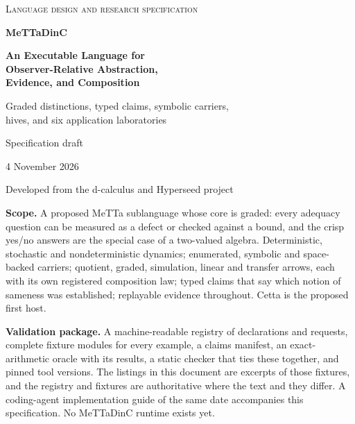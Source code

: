 \documentclass[11pt]{article}
\theoremstyle{definition}
\theoremstyle{plain}
\begin{document}
\hypersetup{pageanchor=false}
\begin{titlepage}
\thispagestyle{empty}
\vspace*{2.2cm}
{\color{dcblue}\large\scshape Language design and research specification\par}
\vspace{1.4cm}
{\color{dcblue}\fontsize{30}{36}\selectfont\bfseries MeTTaDinC\par}
\vspace{0.6cm}
{\LARGE\bfseries An Executable Language for\\[2pt] Observer-Relative Abstraction,\\[2pt] Evidence, and Composition\par}
\vspace{0.7cm}
{\large Graded distinctions, typed claims, symbolic carriers,\\ hives, and six application laboratories\par}
\vspace{1.6cm}
{\large Specification draft\par}
{4 November 2026\par}
\vspace{0.8cm}
{Developed from the d-calculus and Hyperseed project\par}
\vfill
\noindent\begin{minipage}{\textwidth}
\small
{\color{dcblue}\bfseries Scope.} A proposed MeTTa sublanguage whose core is graded: every
adequacy question can be measured as a defect or checked against a bound, and the crisp yes/no
answers are the special case of a two-valued algebra. Deterministic, stochastic and
nondeterministic dynamics; enumerated, symbolic and space-backed carriers; quotient, graded,
simulation, linear and transfer arrows, each with its own registered composition law; typed
claims that say which notion of sameness was established; replayable evidence throughout. Cetta
is the proposed first host.

\smallskip
{\color{dcblue}\bfseries Validation package.} A machine-readable registry of declarations and
requests, complete fixture modules for every example, a claims manifest, an exact-arithmetic
oracle with its results, a static checker that ties these together, and pinned tool versions.
The listings in this document are excerpts of those fixtures, and the registry and fixtures are
authoritative where the text and they differ. A coding-agent implementation guide of the same date
accompanies this specification. No MeTTaDinC runtime exists yet.
\end{minipage}
\end{titlepage}
\hypersetup{pageanchor=true}
\end{document}
